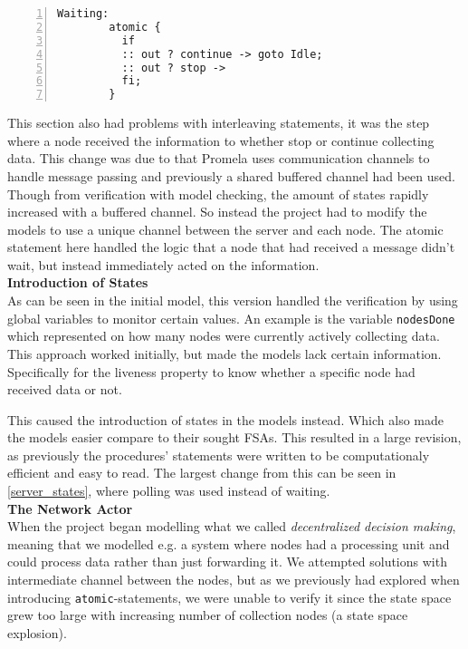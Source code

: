 \begin{lstlisting}[caption={Atomic statement},language=Promela, numbers=left, basicstyle=\footnotesize, tabsize=2]
Waiting:
        atomic {
          if
          :: out ? continue -> goto Idle;
          :: out ? stop -> 
          fi;
        }
\end{lstlisting}

This section also had problems with interleaving statements, it was the step where a node received the information to whether stop or continue collecting data. This change was due to that Promela uses communication channels to handle message passing and previously a shared buffered channel had been used. Though from verification with model checking, the amount of states rapidly increased with a buffered channel. So instead the project had to modify the models to use a unique channel between the server and each node. The atomic statement here handled the logic that a node that had received a message didn't wait, but instead immediately acted on the information. \\

\textbf{Introduction of States} \\


As can be seen in the initial model, this version handled the verification by using global variables to monitor certain values. An example is the variable \texttt{nodesDone} which represented on how many nodes were currently actively collecting data. This approach worked initially, but made the models lack certain information. Specifically for the liveness property to know whether a specific node had received data or not. 

This caused the introduction of states in the models instead. Which also made the models easier compare to their sought FSAs. This resulted in a large revision, as previously the procedures' statements were written to be computationaly efficient and easy to read. The largest change from this can be seen in \ref{server_states}, where polling was used instead of waiting. \\

\textbf{The Network Actor} \\


When the project began modelling what we called \textit{decentralized decision making}, meaning that we modelled e.g. a system where nodes had a processing unit and could process data rather than just forwarding it. We attempted solutions with intermediate channel between the nodes, but as we previously had explored when introducing \texttt{atomic}-statements, we were unable to verify it since the state space grew too large with increasing number of collection nodes (a state space explosion).

